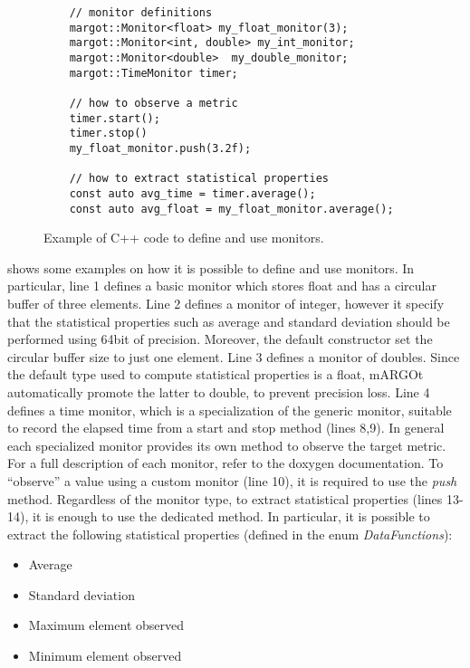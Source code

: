 \begin{figure}[!t]
	\centering
	\lstset{language=MyCPP}
	\begin{lstlisting}
	// monitor definitions
	margot::Monitor<float> my_float_monitor(3);
	margot::Monitor<int, double> my_int_monitor;
	margot::Monitor<double>  my_double_monitor;
	margot::TimeMonitor timer;
	
	// how to observe a metric
	timer.start();
	timer.stop()
	my_float_monitor.push(3.2f);
	
	// how to extract statistical properties
	const auto avg_time = timer.average();
	const auto avg_float = my_float_monitor.average();
	\end{lstlisting}
	\caption{Example of C++ code to define and use monitors.}
	\label{fig:monitor_examples}
\end{figure}

 shows some examples on how it is possible to define and use monitors.
In particular, line 1 defines a basic monitor which stores float and has a circular buffer of three elements.
Line 2 defines a monitor of integer, however it specify that the statistical properties such as average and standard deviation should be performed using 64bit of precision. 
Moreover, the default constructor set the circular buffer size to just one element.
Line 3 defines a monitor of doubles.
Since the default type used to compute statistical properties is a float, mARGOt automatically promote the latter to double, to prevent precision loss.
Line 4 defines a time monitor, which is a specialization of the generic monitor, suitable to record the elapsed time from a start and stop method (lines 8,9).
In general each specialized monitor provides its own method to observe the target metric.
For a full description of each monitor, refer to the doxygen documentation.
To ``observe'' a value using a custom monitor (line 10), it is required to use the \textit{push} method.
Regardless of the monitor type, to extract statistical properties (lines 13-14), it is enough to use the dedicated method.
In particular, it is possible to extract the following statistical properties (defined in the enum \textit{DataFunctions}):

\begin{itemize}
	\item Average
	\item Standard deviation
	\item Maximum element observed
	\item Minimum element observed
\end{itemize}


